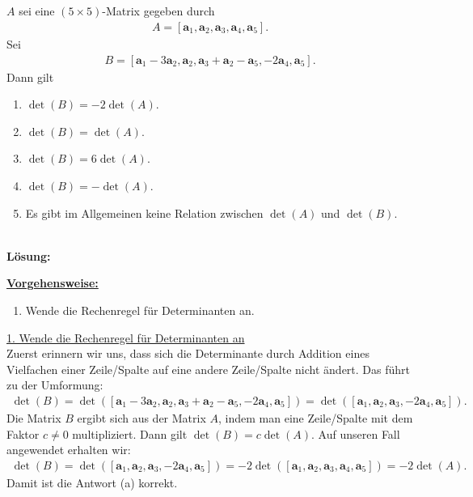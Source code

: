 \subsection*{}
$ A $ sei eine $ (5 \times 5) $-Matrix gegeben durch
\begin{align*}
	A
	=
	\left[
	\textbf{a}_1,
	\textbf{a}_2,
	\textbf{a}_3,
	\textbf{a}_4,
	\textbf{a}_5
	\right].
\end{align*}
Sei 
\begin{align*}
	B =
	\left[
	\textbf{a}_1 - 3 \textbf{a}_2,
	\textbf{a}_2,
	\textbf{a}_3 + \textbf{a}_2 - \textbf{a}_5,
	-2 \textbf{a}_4,
	\textbf{a}_5
	\right].
\end{align*}
Dann gilt
\renewcommand{\labelenumi}{(\alph{enumi})}
\begin{enumerate}
	\item 
	$ \det(B) = -2 \det(A) $.
	\item
	$ \det(B) = \det(A) $.
	\item
	$ \det(B) = 6 \det(A) $.
	\item
	$ \det(B) = -\det(A) $.
	\item
	Es gibt im Allgemeinen keine Relation zwischen $ \det(A) $ und $ \det(B) $.
\end{enumerate}
\ \\
\textbf{Lösung:}
\begin{mdframed}
\underline{\textbf{Vorgehensweise:}}
\renewcommand{\labelenumi}{\theenumi.}
\begin{enumerate}
\item Wende die Rechenregel für Determinanten an.
\end{enumerate}
\end{mdframed}

\underline{1. Wende die Rechenregel für Determinanten an}\\
Zuerst erinnern wir uns, dass sich die Determinante durch Addition eines Vielfachen einer Zeile/Spalte auf eine andere Zeile/Spalte nicht ändert.
Das führt zu der Umformung:
\begin{align*}
	\det(B)
	=
	\det(\left[
	\textbf{a}_1 - 3 \textbf{a}_2,
	\textbf{a}_2,
	\textbf{a}_3 + \textbf{a}_2 - \textbf{a}_5,
	-2 \textbf{a}_4,
	\textbf{a}_5
	\right])
	=
	\det(\left[
	\textbf{a}_1 ,
	\textbf{a}_2,
	\textbf{a}_3 ,
	-2 \textbf{a}_4,
	\textbf{a}_5
	\right]).
\end{align*}
Die Matrix $ B $ ergibt sich aus der Matrix $ A $, indem man eine Zeile/Spalte mit dem Faktor $ c\neq 0 $ multipliziert. Dann gilt $ \det(B) =c \det(A) $. Auf unseren Fall angewendet erhalten wir:
\begin{align*}
	\det(B)
	=
	\det(\left[
	\textbf{a}_1 ,
	\textbf{a}_2,
	\textbf{a}_3 ,
	-2 \textbf{a}_4,
	\textbf{a}_5
	\right])
	=
	-2 
	\det(\left[
	\textbf{a}_1 ,
	\textbf{a}_2,
	\textbf{a}_3 ,
	\textbf{a}_4,
	\textbf{a}_5
	\right])
	=
	-2 \det(A).
\end{align*}
Damit ist die Antwort (a) korrekt.
\newpage
